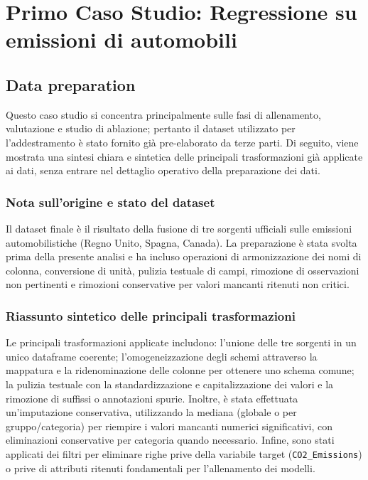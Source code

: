 \documentclass[a4paper,12pt]{report}
\begin{document}
	\chapter{Primo Caso Studio: Regressione su emissioni di automobili}
	
	\section{Data preparation}
	Questo caso studio si concentra principalmente sulle fasi di allenamento, valutazione e studio di ablazione; pertanto il dataset utilizzato per l'addestramento è stato fornito già pre-elaborato da terze parti. Di seguito, viene mostrata una sintesi chiara e sintetica delle principali trasformazioni già applicate ai dati, senza entrare nel dettaglio operativo della preparazione dei dati.
	
	\subsection{Nota sull'origine e stato del dataset}
	Il dataset finale è il risultato della fusione di tre sorgenti ufficiali sulle emissioni automobilistiche (Regno Unito, Spagna, Canada). La preparazione è stata svolta prima della presente analisi e ha incluso operazioni di armonizzazione dei nomi di colonna, conversione di unità, pulizia testuale di campi, rimozione di osservazioni non pertinenti e rimozioni conservative per valori mancanti ritenuti non critici.
	
	\subsection{Riassunto sintetico delle principali trasformazioni}
	Le principali trasformazioni applicate includono: l'unione delle tre sorgenti in un unico dataframe coerente; l'omogeneizzazione degli schemi attraverso la mappatura e la ridenominazione delle colonne per ottenere uno schema comune; la pulizia testuale con la standardizzazione e capitalizzazione dei valori e la rimozione di suffissi o annotazioni spurie. Inoltre, è stata effettuata un'imputazione conservativa, utilizzando la mediana (globale o per gruppo/categoria) per riempire i valori mancanti numerici significativi, con eliminazioni conservative per categoria quando necessario. Infine, sono stati applicati dei filtri per eliminare righe prive della variabile target (\texttt{CO2\_Emissions}) o prive di attributi ritenuti fondamentali per l'allenamento dei modelli.
	
\end{document}
